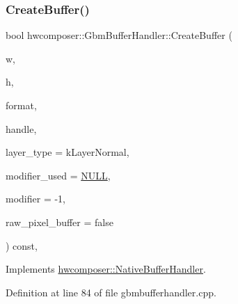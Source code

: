 \subsubsection{\texorpdfstring{Create\+Buffer()}{CreateBuffer()}}
{\footnotesize\ttfamily bool hwcomposer\+::\+Gbm\+Buffer\+Handler\+::\+Create\+Buffer (\begin{DoxyParamCaption}\item[{uint32\+\_\+t}]{w,  }\item[{uint32\+\_\+t}]{h,  }\item[{int}]{format,  }\item[{\mbox{\hyperlink{alios_2platformdefines_8h_ac0a2eaf260f556d17fe489911f017bdf}{H\+W\+C\+Native\+Handle}} $\ast$}]{handle,  }\item[{uint32\+\_\+t}]{layer\+\_\+type = {\ttfamily kLayerNormal},  }\item[{bool $\ast$}]{modifier\+\_\+used = {\ttfamily \mbox{\hyperlink{alios_2platformdefines_8h_a070d2ce7b6bb7e5c05602aa8c308d0c4}{N\+U\+LL}}},  }\item[{int64\+\_\+t}]{modifier = {\ttfamily -\/1},  }\item[{bool}]{raw\+\_\+pixel\+\_\+buffer = {\ttfamily false} }\end{DoxyParamCaption}) const\hspace{0.3cm}{\ttfamily [override]}, {\ttfamily [virtual]}}



Implements \mbox{\hyperlink{classhwcomposer_1_1NativeBufferHandler_a7e58e3d81d3f56cbee34c963b4999fde}{hwcomposer\+::\+Native\+Buffer\+Handler}}.



Definition at line 84 of file gbmbufferhandler.\+cpp.


